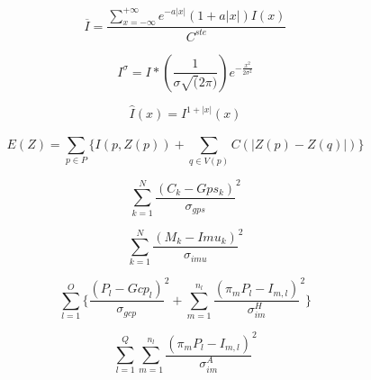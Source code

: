 \begin{equation}
 \overline{I} = \frac{\sum \limits_{x=-\infty}^{+\infty}  e^{-a|x|}(1+a|x|)  I(x) } { C^{ste} }
\end{equation}


\begin{equation}
   I^\sigma  = I \ast  (\frac{1}{\sigma \sqrt(2 \pi)}) e^{-\frac{x^2}{2 \sigma ^ 2}}
\end{equation}

\begin{equation}
   \widehat{I}(x)  = I^{1+|x|} (x)
\end{equation}


\begin{equation}
   E(Z) =  \sum \limits_{p \in P}^{}  \{  I(p,Z(p)) +   \sum \limits_{q\in V(p)}^{} { C( |Z(p)-Z(q)|) }    \}
\end{equation}


\begin{equation}
        \sum \limits_{k =1}^{N}  \frac{(C_k - Gps_k)}{\sigma_{gps}} ^2
\end{equation}

\begin{equation}
        \sum \limits_{k =1}^{N}  \frac{(M_k - Imu_k)}{\sigma_{imu}} ^2
\end{equation}

\begin{equation}
        \sum \limits_{l =1}^{O}   \{ \frac{(P_l - Gcp_l)}{\sigma_{gcp}} ^2     
              + \sum \limits_{m =1}^{n_l}  \frac{ (\pi_m {P_l}- I_{m,l})}{\sigma^H _{im}}^2  \}
\end{equation}

\begin{equation}
        \sum \limits_{l =1}^{Q}   \sum \limits_{m =1}^{n_l}  \frac{ (\pi_m {P_l}- I_{m,l})}{\sigma^A_{im}}^2 
\end{equation}



